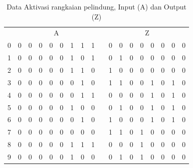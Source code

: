 \begin{table}[H]
	\centering
	\caption{Data Aktivasi rangkaian pelindung, Input (A) dan Output (Z)}
	\label{tab:rawdata}%
	\begin{tabular}{|c|c|c|c|c|c|c|c|c|c|c|c|c|c|c|c|c|c|}
		\hline
		\rowcolor[rgb]{ .949,  .949,  .949} \multicolumn{18}{|c|}{REG} \bigstrut\\
		\hline
		\rowcolor[rgb]{ .949,  .949,  .949} \multicolumn{1}{|p{2.145em}|}{CLK} & \multicolumn{8}{c|}{A}                                        &       & \multicolumn{8}{c|}{Z} \bigstrut\\
		\hline
		0     & 0     & 0     & 0     & 0     & 0     & 1     & 1     & 1     & \multirow{19}[38]{*}{} & 0     & 0     & 0     & 0     & 0     & 0     & 0     & 0 \bigstrut\\
		\cline{1-9}\cline{11-18}    1     & 0     & 0     & 0     & 0     & 0     & 1     & 0     & 1     &       & 0     & 1     & 0     & 0     & 0     & 0     & 0     & 0 \bigstrut\\
		\cline{1-9}\cline{11-18}    2     & 0     & 0     & 0     & 0     & 0     & 1     & 1     & 0     &       & 1     & 0     & 0     & 0     & 0     & 0     & 0     & 0 \bigstrut\\
		\cline{1-9}\cline{11-18}    3     & 0     & 0     & 0     & 0     & 0     & 0     & 1     & 0     &       & 1     & 1     & 0     & 0     & 1     & 0     & 1     & 0 \bigstrut\\
		\cline{1-9}\cline{11-18}    4     & 0     & 0     & 0     & 0     & 0     & 0     & 1     & 1     &       & 0     & 0     & 0     & 0     & 1     & 0     & 1     & 0 \bigstrut\\
		\cline{1-9}\cline{11-18}    5     & 0     & 0     & 0     & 0     & 0     & 1     & 0     & 0     &       & 0     & 1     & 0     & 0     & 1     & 0     & 1     & 0 \bigstrut\\
		\cline{1-9}\cline{11-18}    6     & 0     & 0     & 0     & 0     & 0     & 0     & 1     & 0     &       & 1     & 0     & 0     & 0     & 1     & 0     & 1     & 0 \bigstrut\\
		\cline{1-9}\cline{11-18}    7     & 0     & 0     & 0     & 0     & 0     & 0     & 0     & 0     &       & 1     & 1     & 0     & 1     & 0     & 0     & 0     & 0 \bigstrut\\
		\cline{1-9}\cline{11-18}    8     & 0     & 0     & 0     & 0     & 0     & 1     & 1     & 1     &       & 0     & 0     & 0     & 1     & 0     & 0     & 0     & 0 \bigstrut\\
		\cline{1-9}\cline{11-18}    9     & 0     & 0     & 0     & 0     & 0     & 1     & 0     & 0     &       & 0     & 1     & 0     & 1     & 0     & 0     & 0     & 0 \bigstrut\\

\end{tabular}
\end{table}
